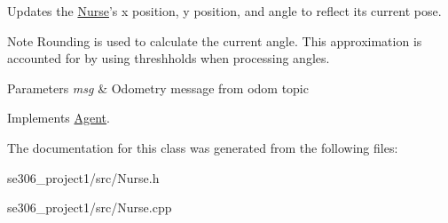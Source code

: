 Updates the \hyperlink{classNurse}{Nurse}'s x position, y position, and angle to reflect its current pose. 

\begin{DoxyNote}{Note}
Rounding is used to calculate the current angle. This approximation is accounted for by using threshholds when processing angles. 
\end{DoxyNote}

\begin{DoxyParams}{Parameters}
{\em msg} & Odometry message from odom topic \\
\hline
\end{DoxyParams}


Implements \hyperlink{classAgent_a4b1182b9ee5dccaa871d71beef94a7d2}{Agent}.



The documentation for this class was generated from the following files\-:\begin{DoxyCompactItemize}
\item 
se306\-\_\-project1/src/Nurse.\-h\item 
se306\-\_\-project1/src/Nurse.\-cpp\end{DoxyCompactItemize}
